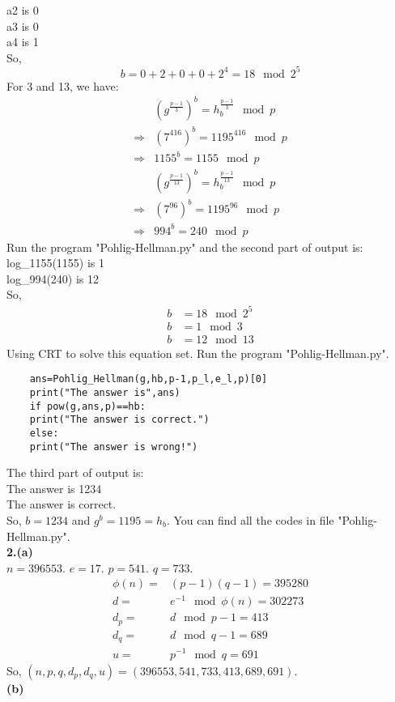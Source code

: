 \documentclass[
12pt, %
]{fphw}
\begin{document}
a2 is 0\\
a3 is 0\\
a4 is 1\\
So,
\[b=0+2+0+0+2^4=18\mod 2^5\]
For 3 and 13, we have:
\begin{align*}
	&(g^\frac{p-1}{3})^b=h_b^\frac{p-1}{3} \mod p\\
	\Rightarrow&(7^{416})^b=1195^{416} \mod p\\
	\Rightarrow&1155^b=1155 \mod p\\
	&(g^\frac{p-1}{13})^b=h_b^\frac{p-1}{13} \mod p\\
	\Rightarrow&(7^{96})^b=1195^{96} \mod p\\
	\Rightarrow&994^b=240 \mod p
\end{align*}
Run the program "Pohlig-Hellman.py" and the second part of output is:\\
log\_1155(1155) is 1\\
log\_994(240) is 12\\
So,
\begin{align*}
	b&=18 \mod 2^5\\
	b&=1 \mod 3\\
	b&=12 \mod 13
\end{align*}
Using CRT to solve this equation set. Run the program "Pohlig-Hellman.py".
\begin{lstlisting}
	ans=Pohlig_Hellman(g,hb,p-1,p_l,e_l,p)[0]
	print("The answer is",ans)
	if pow(g,ans,p)==hb:
	print("The answer is correct.")
	else:
	print("The answer is wrong!")
\end{lstlisting}
The third part of output is:\\
The answer is 1234\\
The answer is correct.\\
So, $b=1234$ and $g^b=1195=h_b$. You can find all the codes in file "Pohlig-Hellman.py".\\
\textbf{2.(a)}\\
$n=396553$. $e=17$. $p=541$. $q=733$.\\
\begin{align*}
	\phi(n)=&(p-1)(q-1)=395280\\
	d=&e^{-1}\mod \phi(n)=302273\\
	d_p=&d\mod p-1=413\\
	d_q=&d\mod q-1=689\\
	u=&p^{-1} \mod q=691
\end{align*}
So, $(n,p,q,d_p,d_q,u)=(396553,541,733,413,689,691)$.\\
\textbf{(b)}\\
\end{document}
